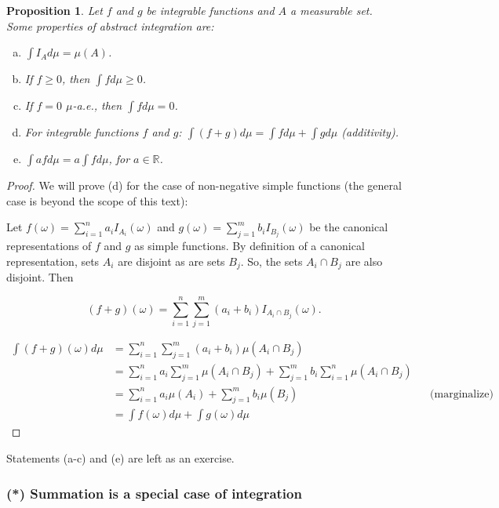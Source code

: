 \documentclass{book}
\theoremstyle{plain}%
\newtheorem{proposition}{Proposition}[section]
\theoremstyle{definition}
\begin{document}
\begin{proposition}

Let $f$ and $g$ be integrable functions and $A$ a measurable set. Some properties of abstract integration are:

\begin{enumerate}[(a)]
\item $\int I_A d\mu = \mu(A)$.
\item If $f \geq 0$, then $\int f d\mu \geq 0$.
\item If $f = 0$ $\mu$-a.e., then $\int f d\mu = 0$.
\item For integrable functions $f$ and $g$: $\int (f + g) d\mu = \int f d\mu + \int g d\mu$ \emph{(additivity)}.
\item $\int afd\mu = a \int fd\mu$, for $a \in \mathbb{R}$.
\end{enumerate}\label{prop:abstract}
\end{proposition}

\begin{proof}
We will prove (d) for the case of non-negative simple functions (the general case is beyond the scope of this text):

Let $f(\omega) = \sum_{i=1}^n a_i I_{A_i}(\omega)$ and  $g(\omega) = \sum_{j=1}^m b_i I_{B_j}(\omega)$ be the canonical representations of $f$ and $g$ as simple functions. By definition of a canonical representation, sets $A_i$ are disjoint as are sets $B_j$. So, the sets $A_i \cap B_j$ are also disjoint. Then

$$(f + g)(\omega) = \sum_{i=1}^n \sum_{j=1}^m (a_i + b_i) I_{A_i \cap B_j}(\omega).$$

\begin{align*}
\int (f + g)(\omega) d\mu &= \sum_{i=1}^n \sum_{j=1}^m (a_i + b_i) \mu(A_i \cap B_j) \\
&= \sum_{i=1}^n a_i \sum_{j=1}^m  \mu(A_i \cap B_j) + \sum_{j=1}^m b_i \sum_{i=1}^n \mu(A_i \cap B_j)  \\
&= \sum_{i=1}^n a_i
 \mu(A_i) + \sum_{j=1}^m b_i \mu(B_j) && \text{(marginalize)} \\
&= \int f(\omega) d\mu + \int g(\omega) d\mu  
\end{align*}
\end{proof}

Statements (a-c) and (e) are left as an exercise.


\subsubsection*{(*) Summation is a special case of integration}
\end{document}

